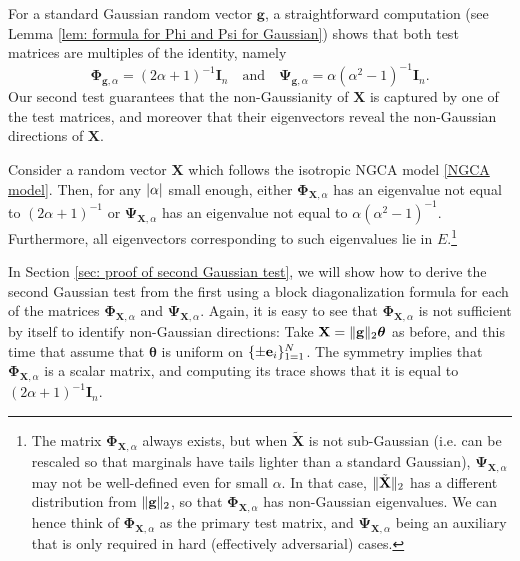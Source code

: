 \documentclass[final,12pt]{colt2018} %
\numberwithin{equation}{section}
\DeclarePairedDelimiter{\abs}{\lvert}{\rvert}
\DeclarePairedDelimiter{\norm}{\lVert}{\rVert}
\DeclarePairedDelimiter{\braces}{\lbrace}{\rbrace}
\newcommand{\boldg}{\textbf{g}}
\newcommand{\boldPhi}{\boldsymbol{\Phi}}
\newcommand{\boldPsi}{\boldsymbol{\Psi}}
\newcommand{\boldtheta}{\boldsymbol{\theta}}
\newcommand{\boldI}{\textbf{I}}
\newcommand{\boldX}{\textbf{X}}
\begin{document}
For a standard Gaussian random vector $\boldg$, a straightforward computation (see Lemma \ref{lem: formula for Phi and Psi for Gaussian}) shows that both test matrices are multiples of the identity, namely
\begin{equation}		\label{eq: test matrices for Gaussian}
  \boldPhi_{\boldg,\alpha} = (2\alpha+1)^{-1} \boldI_n
  \quad \text{and} \quad
  \boldPsi_{\boldg,\alpha} = \alpha(\alpha^2-1)^{-1} \boldI_n.
\end{equation}
Our second test guarantees that the non-Gaussianity of $\boldX$ is captured by 
one of the test matrices, and moreover that their eigenvectors reveal the non-Gaussian directions of $\boldX$.

\begin{theorem} \label{thm: second Gaussian test}
  Consider a random vector $\boldX$ which follows the isotropic NGCA model \eqref{NGCA model}. Then, for any $\abs*{\alpha}$ small enough, 
  either $\boldPhi_{\boldX,\alpha}$ has an eigenvalue not equal to $(2\alpha+1)^{-1}$ 
  or $\boldPsi_{\boldX,\alpha}$ has an eigenvalue not equal to $\alpha(\alpha^2-1)^{-1}$. 
  Furthermore, all eigenvectors corresponding to such eigenvalues lie in $E$.\footnote{The matrix $\boldPhi_{\boldX,\alpha}$ always exists, but when $\tilde{\boldX}$ is not sub-Gaussian (i.e. can be rescaled so that marginals have tails lighter than a standard Gaussian), $\boldPsi_{\boldX,\alpha}$ may not be well-defined even for small $\alpha$. In that case, $\norm{\tilde{\boldX}}_2$ has a different distribution from $\norm{\boldg}_2$, so that $\boldPhi_{\boldX,\alpha}$ has non-Gaussian eigenvalues. We can hence think of $\boldPhi_{\boldX,\alpha}$ as the primary test matrix, and $\boldPsi_{\boldX,\alpha}$ being an auxiliary that is only required in hard (effectively adversarial) cases.}
\end{theorem}

In Section \ref{sec: proof of second Gaussian test}, we will show how to derive the second Gaussian test from the first using a block diagonalization formula for each of the matrices $\boldPhi_{\boldX,\alpha}$ and $\boldPsi_{\boldX,\alpha}$. Again, it is easy to see that $\boldPhi_{\boldX,\alpha}$ is not sufficient by itself to identify non-Gaussian directions: Take $\boldX = \norm{\boldg}_2\boldtheta$ as before, and this time that assume that $\boldtheta$ is uniform on $\braces{\pm \textbf{e}_i}_{1=1}^N$. The symmetry implies that $\boldPhi_{\boldX,\alpha}$ is a scalar matrix, and computing its trace shows that it is equal to $(2\alpha+1)^{-1} \boldI_n$.
\end{document}
